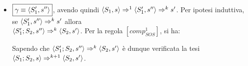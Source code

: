 {\begin{itemize}
\item $\boxed{\gamma \equiv \confSs{S_1'}{s''}}$, avendo
  quindi $\confSs{S_1}{s} \Rar{1} \confSs{S_1'}{s''} \Rar{k} s'$. Per ipotesi
  induttiva, se $\confSs{S_1'}{s''} \Rar{k} s'$ allora \\
  $\confSs{S_1'; S_2}{s''} \Rar{k} \confSs{S_2}{s'}$. Per la regola
  $[comp^1_{SOS}]$, si ha:

\begin{prooftree}
\end{prooftree}

  Sapendo che $\confSs{S_1'; S_2}{s''} \Rar{k} \confSs{S_2}{s'}$ è dunque
  verificata la tesi $\confSs{S_1; S_2}{s} \Rar{k+1} \confSs{S_2}{s'}$.
\end{itemize}
}
